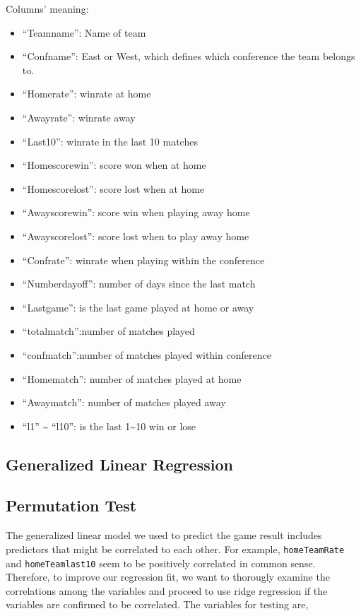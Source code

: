 \documentclass[]{article}
\providecommand{\tightlist}{%
  \setlength{\itemsep}{0pt}\setlength{\parskip}{0pt}}
\begin{document}
Columns' meaning:

\begin{itemize}
\tightlist
\item
  ``Teamname'': Name of team
\item
  ``Confname'': East or West, which defines which conference the team
  belongs to.
\item
  ``Homerate'': winrate at home
\item
  ``Awayrate'': winrate away
\item
  ``Last10'': winrate in the last 10 matches
\item
  ``Homescorewin'': score won when at home
\item
  ``Homescorelost'': score lost when at home
\item
  ``Awayscorewin'': score win when playing away home
\item
  ``Awayscorelost'': score lost when to play away home
\item
  ``Confrate'': winrate when playing within the conference
\item
  ``Numberdayoff'': number of days since the last match
\item
  ``Lastgame'': is the last game played at home or away
\item
  ``totalmatch'':number of matches played
\item
  ``confmatch'':number of matches played within conference
\item
  ``Homematch'': number of matches played at home
\item
  ``Awaymatch'': number of matches played away
\item
  ``l1'' \textasciitilde{} ``l10'': is the last 1\textasciitilde{}10 win
  or lose
\end{itemize}

\hypertarget{generalized-linear-regression}{%
\subsection{Generalized Linear
Regression}\label{generalized-linear-regression}}

\hypertarget{permutation-test}{%
\subsection{Permutation Test}\label{permutation-test}}

The generalized linear model we used to predict the game result includes
predictors that might be correlated to each other. For example,
\texttt{homeTeamRate} and \texttt{homeTeamlast10} seem to be positively
correlated in common sense. Therefore, to improve our regression fit, we
want to thorougly examine the correlations among the variables and
proceed to use ridge regression if the variables are confirmed to be
correlated. The variables for testing are,
\end{document}
